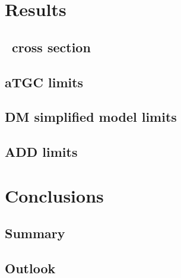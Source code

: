 \documentclass[oneside, letterpaper, 12pt, oldfontcommands]{memoir}
\begin{document}
\chapter{Results}
\section{\zinvg\ cross section}
\section{aTGC limits}
\section{DM simplified model limits}
\section{ADD limits}

\chapter{Conclusions}
\section{Summary}
\section{Outlook}

% 
% 
\end{document}
